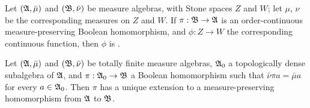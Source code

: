      
 Let $(\frak A,\bar\mu)$ and
$(\frak B,\bar\nu)$ be measure algebras, with Stone spaces $Z$ and $W$;   
let $\mu$, $\nu$ be the corresponding measures on $Z$ and $W$.   If
$\pi:\frak B\to\frak A$ is an order-continuous
measure-preserving Boolean homomorphism, and $\phi:Z\to W$ the
corresponding continuous function, then $\phi$ is \imp.
     
     
 Let $(\frak A,\bar\mu)$ and
$(\frak B,\bar\nu)$ be
totally finite measure algebras, $\frak A_0$ a topologically dense
subalgebra of $\frak A$, and $\pi:\frak A_0\to\frak B$ a Boolean
homomorphism such that $\bar\nu\pi a=\bar\mu a$ for every
$a\in\frak A_0$.
Then $\pi$ has a unique extension to a measure-preserving homomorphism
from $\frak A$ to $\frak B$.
     

